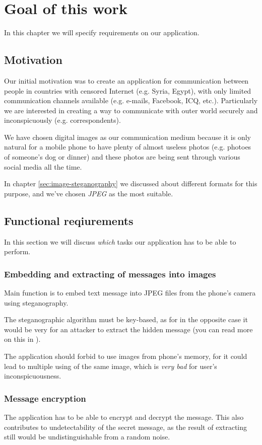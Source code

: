 \chapter{Goal of this work}

In this chapter we will specify requirements on our application.

\section{Motivation}

Our initial motivation was to create an application for communication between
people in countries with censored Internet (e.g. Syria, Egypt), with only limited communication channels
available (e.g. e-mails, Facebook, ICQ, etc.). Particularly we are interested in
creating a way to communicate with outer world securely and inconspicuously 
(e.g. correspondents).

We have chosen digital images as our communication medium because it is only natural for
a mobile phone to have plenty of almost useless photos (e.g. photoes of someone's dog or dinner)
and these photos are being sent through various social media all the time.

In chapter \ref{sec:image-steganography} we discussed about different formats for
this purpose, and we've chosen \emph{JPEG} as the most suitable.

\section{Functional reqiurements}
In this section we will discuss \emph{which} tasks our application has to be able to perform.

\subsection{Embedding and extracting of messages into images}
Main function is to embed text message into JPEG files from the phone's camera using steganography.

The steganographic algorithm must be key-based, as for in the opposite case it would be very for an attacker
to extract the hidden message (you can read more on this in \cite{Ostertag1996}).

The application should forbid to use images from phone's memory, for it could lead to multiple 
using of the same image, which is \emph{very bad} for user's inconspicuousness.

\subsection{Message encryption}
The application has to be able to encrypt and decrypt the message. This also contributes
to undetectability of the secret message, as the result of extracting still would be 
undistinguishable from a random noise.

